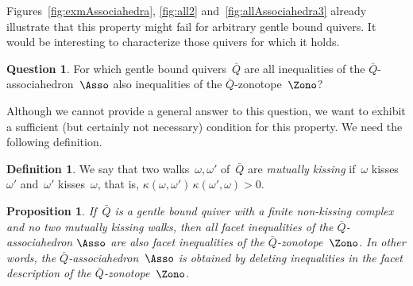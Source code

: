 \documentclass{memo-l}
\newtheorem{proposition}[theorem]{Proposition}
\theoremstyle{definition}
\newtheorem{definition}[theorem]{Definition}
\newtheorem{question}[theorem]{Question}
\newcommand{\darkblue}{\color{darkblue}} %
\newcommand{\defn}[1]{\textsl{\darkblue #1}} %
\newcommand{\kn}{\kappa} %
\begin{document}
Figures~\ref{fig:exmAssociahedra}, \ref{fig:all2} and~\ref{fig:allAssociahedra3} already illustrate that this property might fail for arbitrary gentle bound quivers.
It would be interesting to characterize those quivers for which it holds.

\begin{question}
For which gentle bound quivers~$\bar Q$ are all inequalities of the $\bar Q$-associahedron~$\Asso$ also inequalities of the $\bar Q$-zonotope~$\Zono$?
\end{question}

Although we cannot provide a general answer to this question, we want to exhibit a sufficient (but certainly not necessary) condition for this property.
We need the following definition.

\begin{definition}
We say that two walks~$\omega, \omega'$ of~$\bar Q$ are \defn{mutually kissing} if~$\omega$ kisses~$\omega'$ and~$\omega'$ kisses~$\omega$, that is, $\kn(\omega,\omega') \, \kn(\omega',\omega) > 0$.
\end{definition}

\begin{proposition}
\label{prop:zonotope}
If~$\bar Q$ is a gentle bound quiver with a finite non-kissing complex and no two mutually kissing walks, then all facet inequalities of the $\bar Q$-associahedron $\Asso$ are also facet inequalities of the $\bar Q$-zonotope~$\Zono$.
In other words, the $\bar Q$-associahedron~$\Asso$ is obtained by deleting inequalities in the facet description of the $\bar Q$-zonotope~$\Zono$.
\end{proposition}
\end{document}
